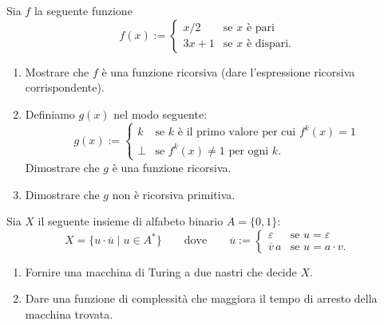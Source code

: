 \newpage
\begin{ex}
Sia $f$ la seguente funzione
\[
f(x):=
\begin{cases}
x/2 & \text{se } x \text{ è pari}\\
3x+1 & \text{se } x \text{ è dispari.}
\end{cases}
\]
\begin{enumerate}
\item Mostrare che $f$ è una funzione ricorsiva (dare l'espressione ricorsiva corrispondente).
\item Definiamo $g(x)$ nel modo seguente:
\[
g(x):=
\begin{cases}
k & \text{se } k \text{ è il primo valore per cui } f^k(x)=1\\
\bot & \text{se } f^k(x)\neq 1 \text{ per ogni } k.
\end{cases}
\]
Dimostrare che $g$ è una funzione ricorsiva.
\item Dimostrare che $g$ non è ricorsiva primitiva.
\end{enumerate}
\end{ex}


\newpage
\begin{ex}
Sia $X$ il seguente insieme di alfabeto binario $A=\{0,1\}$:
\[
X=\{u\cdot\overline u\mid u\in A^*\}\qquad\text{dove}\qquad
\overline u:=
\begin{cases}
\varepsilon & \text{se } u=\varepsilon\\
\overline v\,a & \text{se } u=a\cdot v.
\end{cases}
\]
\begin{enumerate}
\item Fornire una macchina di Turing a due nastri che decide $X$.
\item Dare una funzione di complessità che maggiora il tempo di arresto della macchina trovata.
\end{enumerate}
\end{ex}

